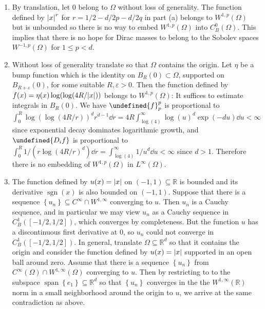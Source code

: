 \documentclass[11pt,leqno]{article}
\theoremstyle{plain}
\theoremstyle{definition}
\numberwithin{equation}{section}
\numberwithin{lem}{section}
\newcommand{\cbr}[1]{\left\{#1\right\}}
\DeclareMathOperator{\Span}{span}
\DeclareMathOperator{\sgn}{sgn}
\let\norm\undefined %
\DeclarePairedDelimiter\norm{\lVert}{\rVert}
\begin{document}
\begin{enumerate}
\begin{enumerate}
      \item By translation, let $0$ belong to $\Omega$ without loss of generality. The function defined by $\abs{x}^r$ for $r = 1/2-d/2p-d/2q$ in part (a) belongs to $W^{1,p}(\Omega)$ but is unbounded so there is no way to embed $W^{1,p}(\Omega)$ into $C^0_B(\Omega)$. This implies that there is no hope for Dirac masses to belong to the Sobolev spaces $W^{-1,p}(\Omega)$ for $1\leq p < d$. 
      \item Without loss of generality translate so that $\Omega$ contains the origin. Let $\eta$ be a bump function which is the identity on $B_R(0)\subset \Omega$, supported on $B_{R+\varepsilon}(0)$, for some suitable $R,\varepsilon>0$. Then the function defined by $f(x) = \eta(x)\log(\log(4R/\abs{x}))$ belongs to $W^{1,p}(\Omega)$: It suffices to estimate integrals in $B_R(0)$. We have $\norm{f}_p^p$ is proportional to $\int_0^R \log(\log(4R/r))^d r^{d-1}\dd r = 4R\int_{\log(4)}^\infty \log(u)^d\exp(-du)\dd u < \infty$ since exponential decay dominates logarithmic growth, and $\norm{D_if}$ is proportional to $\int_0^R1/(r\log(4R/r)^d)\dd r = \int_{\log(4)}^\infty1/u^d\dd u <\infty$ since $d>1$. Therefore there is no embedding of $W^{1,p}(\Omega)$ in $L^\infty(\Omega)$.
      \item The function defined by $u(x) = \abs{x}$ on $(-1,1)\subseteq \mathbb R$ is bounded and its derivative $\sgn(x)$ is also bounded on $(-1,1)$. Suppose that there is a sequence $\cbr{u_n}\subseteq C^\infty\cap W^{1,\infty}$ converging to $u$. Then $u_n$ is a Cauchy sequence, and in particular we may view $u_n$ as a Cauchy sequence in $C^1_B([-1/2,1/2])$, which converges by completeness. But the function $u$ has a discontinuous first derivative at $0$, so $u_n$ could not converge in $C^1_B([-1/2,1/2])$. In general, translate $\Omega\subseteq \mathbb R^d$ so that it contains the origin and consider the function defined by $u(x) = \abs{x}$ supported in an open ball around zero. Assume that there is a sequence $\cbr{u_n}$ from $C^{\infty}(\Omega)\cap W^{1,\infty}(\Omega)$ converging to $u$. Then by restricting to to the subspace $\Span\cbr{e_1}\subseteq \mathbb R^d$ so that $\cbr{u_n}$ converges in the the $W^{1,\infty}(\mathbb R)$ norm in a small neighborhood around the origin to $u$, we arrive at the same contradiction as above.
    \end{enumerate}
\end{enumerate}
\end{document}

